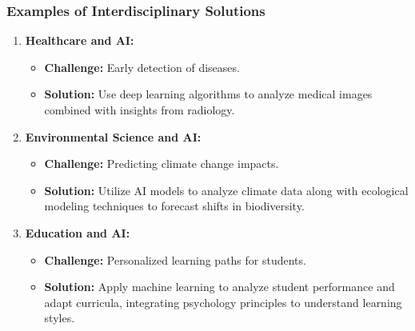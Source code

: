 \documentclass[aspectratio=169]{beamer}
\begin{document}
\begin{frame}[fragile]
    \frametitle{Examples of Interdisciplinary Solutions}
    \begin{enumerate}
        \item \textbf{Healthcare and AI:} 
        \begin{itemize}
            \item \textbf{Challenge:} Early detection of diseases. 
            \item \textbf{Solution:} Use deep learning algorithms to analyze medical images combined with insights from radiology.
        \end{itemize}
        
        \item \textbf{Environmental Science and AI:} 
        \begin{itemize}
            \item \textbf{Challenge:} Predicting climate change impacts. 
            \item \textbf{Solution:} Utilize AI models to analyze climate data along with ecological modeling techniques to forecast shifts in biodiversity.
        \end{itemize}
        
        \item \textbf{Education and AI:} 
        \begin{itemize}
            \item \textbf{Challenge:} Personalized learning paths for students. 
            \item \textbf{Solution:} Apply machine learning to analyze student performance and adapt curricula, integrating psychology principles to understand learning styles.
        \end{itemize}
    \end{enumerate}
\end{frame}
\end{document}
